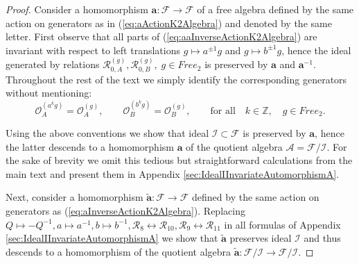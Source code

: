 \documentclass{amsart}
\newcommand{\Oa}{\mathcal O_A}
\newcommand{\Ob}{\mathcal O_B}
\newcommand{\R}{\mathcal R}
\begin{document}
\begin{proof}
Consider a homomorphism $\mathbf a:\mathcal F\rightarrow\mathcal F$ of a free algebra defined by the same action on generators as in (\ref{eq:aActionK2Algebra}) and denoted by the same letter. First observe that all parts of (\ref{eq:aaInverseActionK2Algebra}) are invariant with respect to left translations $g\mapsto a^{\pm1}g$ and $g\mapsto b^{\pm1}g$, hence the ideal generated by relations $\R_{0,A}^{(g)},\R_{0,B}^{(g)},\;g\in Free_2$ is preserved by $\mathbf a$ and $\mathbf a^{-1}$. Throughout the rest of the text we simply identify the corresponding generators without mentioning:
\begin{equation*}
\Oa^{(a^kg)}=\Oa^{(g)},\qquad\Ob^{(b^kg)}=\Ob^{(g)},\qquad\textrm{for all}\quad k\in\mathbb Z,\quad g\in Free_2.
\end{equation*}

Using the above conventions we show that ideal $\mathcal I\subset\mathcal F$ is preserved by $\mathbf a$, hence the latter descends to a homomorphism $\mathbf a$ of the quotient algebra $\mathcal A=\mathcal F/\mathcal I$. For the sake of brevity we omit this tedious but straightforward calculations from the main text and present them in Appendix \ref{sec:IdealIInvariateAutomorphismA}.

Next, consider a homomorphism $\widetilde{\mathbf a}:\mathcal F\rightarrow\mathcal F$ defined by the same action on generators as (\ref{eq:aInverseActionK2Algebra}). Replacing $Q\mapsto -Q^{-1},a\mapsto a^{-1},b\mapsto b^{-1}, \R_8\leftrightarrow \R_{10}, \R_9\leftrightarrow\R_{11}$ in all formulas of Appendix \ref{sec:IdealIInvariateAutomorphismA} we show that $\widetilde{\mathbf a}$ preserves ideal $\mathcal I$ and thus descends to a homomorphism of the quotient algebra $\widetilde{\mathbf a}:\mathcal F/\mathcal I\rightarrow\mathcal F/\mathcal I$.


\end{proof}
\end{document}
